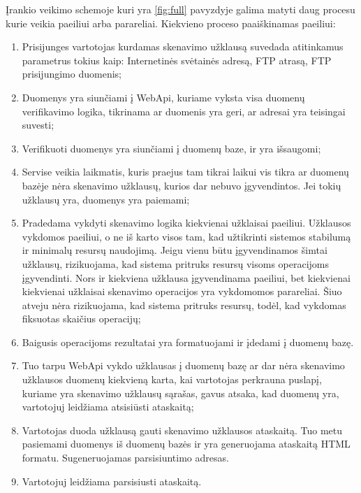 \documentclass[a4paper,12pt,fleqn]{article}
\begin{document}
Įrankio veikimo schemoje kuri yra \ref{fig:full} pavyzdyje galima matyti daug procesu kurie veikia paeiliui arba parareliai. Kiekvieno proceso paaiškinamas paeiliui:

\begin{enumerate}
	
	\item Prisijunges vartotojas kurdamas skenavimo užklausą suvedada atitinkamus parametrus tokius kaip: Internetinės svėtainės adresą, FTP atrasą, FTP prisijungimo duomenis;
	
	\item Duomenys yra siunčiami į WebApi, kuriame vyksta visa duomenų verifikavimo logika, tikrinama ar duomenis yra geri, ar adresai yra teisingai suvesti;
	
	\item Verifikuoti duomenys yra siunčiami į duomenų baze, ir yra išsaugomi;
	
	\item Servise veikia laikmatis, kuris praejus tam tikrai laikui vis tikra ar duomenų bazėje nėra skenavimo užklausų, kurios dar nebuvo įgyvendintos. Jei tokių užklausų yra, duomenys yra paiemami;
	
	\item  Pradedama vykdyti skenavimo logika kiekvienai užklaisai paeiliui. Užklausos vykdomos paeiliui, o ne iš karto visos tam, kad užtikrinti sistemos stabilumą ir minimalų resursų naudojimą. Jeigu vienu būtu įgyvendinamos šimtai užklausų, rizikuojama, kad sistema pritruks resursų visoms operacijoms įgyvendinti. Nors ir kiekviena užklausa įgyvendinama paeiliui, bet kiekvienai kiekvienai užklaisai skenavimo operacijos yra vykdomomos parareliai. Šiuo atveju nėra rizikuojama, kad sistema pritruks resursų, todėl, kad vykdomas fiksuotas skaičius operacijų;
	
	\item Baigusis operacijoms rezultatai yra formatuojami ir įdedami į duomenų bazę.
	
	\item Tuo tarpu WebApi vykdo užklausas į duomenų bazę ar dar nėra skenavimo užklausos duomenų kiekvieną karta, kai vartotojas perkrauna puslapį, kuriame yra skenavimo užklausų sąrašas, gavus atsaka, kad duomenų yra, vartotojuj leidžiama atsisiūsti ataskaitą;
	
	\item Vartotojas duoda užklausą gauti skenavimo užklausos ataskaitą. Tuo metu pasiemami duomenys iš duomenų bazės ir yra generuojama ataskaitą HTML formatu. Sugeneruojamas parsisiuntimo adresas.
	
	\item Vartotojuj leidžiama parsisiusti ataskaitą.
	
\end{enumerate}
\end{document}
